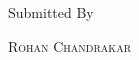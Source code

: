\documentclass[a4paper, 11pt, oneside]{book} %
\begin{document}
\begin{titlepage}
	\vspace*{7\baselineskip} %
	
	
	Submitted By
	
	\vspace{1\baselineskip} %
	
	{\scshape\LARGE Rohan Chandrakar} %
	
	\vspace{0.5\baselineskip} %
	
	
	\vfill %
	

\end{titlepage}

\end{document}
